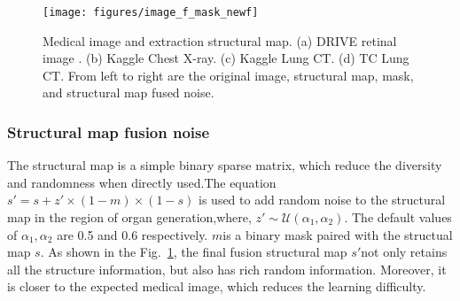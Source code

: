 \documentclass[runningheads]{llncs}
\begin{document}
	\begin{figure}[thbp!]
		\centering
		\texttt{[image: figures/image\_f\_mask\_newf]}
		\caption{Medical image and extraction structural map. (a) DRIVE retinal image . (b) Kaggle Chest X-ray. (c) Kaggle Lung CT. (d) TC Lung CT. From left to right are the original image, structural map, mask, and structural map fused noise.}
		\label{image_and_f}
	\end{figure}	
	\subsubsection{Structural map fusion noise}	
	The structural map is a simple binary sparse matrix, which reduce the diversity and randomness when directly used.The equation $s'=s+z'\times(1-m)\times(1-s)$ is used to add random noise to the structural map in the region of organ generation,where, $z'\sim\mathcal{U}(\alpha_1,\alpha_2)$. The default values of $\alpha_1,\alpha_2$ are 0.5 and 0.6 respectively. $m$is a binary mask paired with the structual map $s$. As shown in the Fig.~\ref{image_and_f}, the final fusion structural map $s'$not only retains all the structure information, but also has rich random information. Moreover, it is closer to the expected medical image, which reduces the learning difficulty. 
\end{document}
